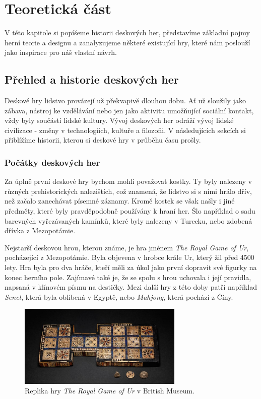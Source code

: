 \chapter{Teoretická část}
\label{chap:theory}

V této kapitole si popíšeme historii deskových her, představíme základní pojmy herní teorie a designu a zanalyzujeme některé existující hry, které nám poslouží jako inspirace pro náš vlastní návrh.

\section{Přehled a historie deskových her}
\label{sec:history}

Deskové hry lidstvo provázejí už překvapivě dlouhou dobu. Ať už sloužily jako zábava, nástroj ke vzdělávání nebo jen jako aktivitu umožňující sociální kontakt, vždy byly součástí lidské kultury. Vývoj deskových her odráží vývoj lidské civilizace - změny v technologiích, kultuře a filozofii. V následujících sekcích si přiblížíme historii, kterou si deskové hry v průběhu času prošly.

\subsection{Počátky deskových her}
\label{subsec:beginnings}

Za úplně první deskové hry bychom mohli považovat kostky. Ty byly nalezeny v různých prehistorických nalezištích, což znamená, že lidstvo si s nimi hrálo dřív, než začalo zanechávat písemné záznamy. Kromě kostek se však našly i jiné předměty, které byly pravděpodobně používány k hraní her. Šlo například o sadu barevných vyřezávaných kamínků, které byly nalezeny v Turecku, nebo zdobená dřívka z Mezopotámie. \cite{attia_2018}

Nejstarší deskovou hrou, kterou známe, je hra jménem \textit{The Royal Game of Ur}, pocházející z Mezopotámie. Byla objevena v hrobce krále Ur, který žil před 4500 lety. Hra byla pro dva hráče, kteří měli za úkol jako první dopravit své figurky na konec herního pole. Zajímavé také je, že se spolu s hrou uchovala i její pravidla, napsaná v klínovém písmu na destičky. Mezi další hry z této doby patří například \textit{Senet}, která byla oblíbená v Egyptě, nebo \textit{Mahjong}, která pochází z Číny. \cite{british_museum_2021}

\begin{figure}[H]
    \centering
    \includegraphics[width=0.7\textwidth]{Figures/Theory/royal-game-of-ur-british-museum.jpg}
    \caption{Replika hry \textit{The Royal Game of Ur} v British Museum. \cite{british_museum_2021}}
    \label{fig:royal_game_of_ur}
\end{figure}

